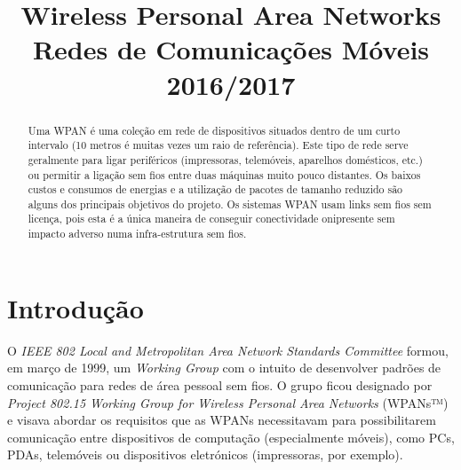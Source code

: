 \documentclass[conference]{IEEEtran}
\begin{document}
\title{Wireless Personal Area Networks\\
  \large Redes de Comunicações Móveis\\
  2016/2017
}

\author{
\and
{}
}

\maketitle

\begin{abstract}

Uma WPAN é uma coleção em rede de dispositivos situados dentro de um curto intervalo (10 metros é muitas vezes um raio de referência). Este tipo de rede serve geralmente para ligar periféricos (impressoras, telemóveis, aparelhos domésticos, etc.) ou permitir a ligação sem fios entre duas máquinas muito pouco distantes. Os baixos custos e consumos de energias e a utilização de pacotes de tamanho reduzido são alguns dos principais objetivos do projeto. Os sistemas WPAN usam links sem fios sem licença, pois esta é a única maneira de conseguir conectividade onipresente sem impacto adverso numa infra-estrutura sem fios.

\end{abstract}


\IEEEpeerreviewmaketitle


\section{Introdução}

O \textit{IEEE 802 Local and Metropolitan Area Network Standards Committee} formou, em março de 1999, um \textit{Working Group} com o intuito de desenvolver padrões de comunicação para redes de área pessoal sem fios. 
O grupo ficou designado por \textit{Project 802.15 Working Group for Wireless Personal Area Networks} (WPANs™) e visava abordar os requisitos que as WPANs necessitavam para possibilitarem comunicação entre dispositivos de computação (especialmente móveis), como PCs, PDAs, telemóveis ou dispositivos eletrónicos (impressoras, por exemplo).
\end{document}
